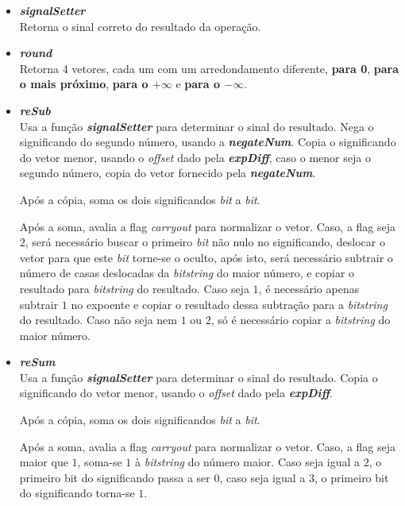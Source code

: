\documentclass{article}
\begin{document}
\begin{itemize}
    \item \textbf{\textit{signalSetter}}
        \\ Retorna o sinal correto do resultado da operação.
    
    \item \textbf{\textit{round}}
        \\ Retorna 4 vetores, cada um com um arredondamento diferente,
        \textbf{para 0}, \textbf{para o mais próximo}, \textbf{para o $+
        \infty$} e \textbf{para o $- \infty$}.

    \item \textbf{\textit{reSub}}
        \\ Usa a função \textit{\textbf{signalSetter}} para determinar o sinal
        do resultado. Nega o significando do segundo número, usando a 
        \textbf{\textit{negateNum}}. Copia o significando do vetor menor, usando 
        o \textit{offset} dado pela \textit{\textbf{expDiff}}, caso o menor seja 
        o segundo número, copia do vetor fornecido pela \textit{\textbf{negateNum}}.

        Após a cópia, soma os dois significandos \textit{bit} a \textit{bit}.
        
        Após a soma, avalia a flag \textit{carryout} para normalizar o vetor. Caso, a flag 
        seja $2$, será necessário buscar o primeiro \textit{bit} não nulo no
        significando, deslocar o vetor para que este \textit{bit} torne-se o
        oculto, após isto, será necessário subtrair o número de casas deslocadas
        da \textit{bitstring} do maior número, e copiar o resultado para
        \textit{bitstring} do resultado. Caso seja $1$, é necessário apenas subtrair $1$
        no expoente e copiar o resultado dessa subtração para a \textit{bitstring} 
        do resultado. Caso não seja nem $1$ ou $2$, só é necessário copiar a 
        \textit{bitstring} do maior número.
    
    \item \textbf{\textit{reSum}}
        \\ Usa a função \textit{\textbf{signalSetter}} para determinar o sinal
        do resultado. Copia o significando do vetor menor, usando o \textit{offset} 
        dado pela \textit{\textbf{expDiff}}.

        Após a cópia, soma os dois significandos \textit{bit} a \textit{bit}.

        Após a soma, avalia a flag \textit{carryout} para normalizar o vetor.
        Caso, a flag seja maior que $1$, soma-se $1$ à \textit{bitstring} do
        número maior. Caso seja igual a $2$, o primeiro bit do significando
        passa a ser $0$, caso seja igual a $3$, o primeiro bit do significando
        torna-se $1$.

\end{itemize}
\end{document}

